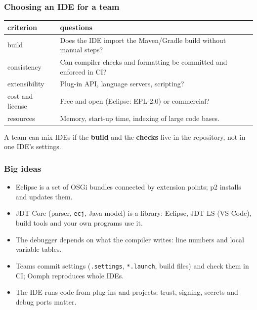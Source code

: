 \documentclass[aspectratio=169,10pt,compress]{beamer}
\begin{document}
\begin{frame}[t,fragile] \frametitle{Choosing an IDE for a team}
  \begin{center}\small
  \begin{tabular}{L{0.26\textwidth}L{0.66\textwidth}}
    \toprule
    \textbf{criterion}            & \textbf{questions} \\
    \midrule
    build                         & Does the IDE import the Maven/Gradle build without manual steps? \\
    consistency                   & Can compiler checks and formatting be committed and enforced in CI? \\
    extensibility                 & Plug-in API, language servers, scripting? \\
    cost and license              & Free and open (Eclipse: EPL-2.0) or commercial? \\
    resources                     & Memory, start-up time, indexing of large code bases. \\
    \bottomrule
  \end{tabular}
  \end{center}
  \small A team can mix IDEs if the \textbf{build} and the \textbf{checks} live in the repository, not in one IDE's settings.
\end{frame}





\begin{frame}[t,fragile] \frametitle{Big ideas}
  \begin{itemize}
    \item Eclipse is a set of OSGi bundles connected by extension points; p2 installs and updates them.
    \item JDT Core (parser, \texttt{ecj}, Java model) is a library: Eclipse, JDT LS (VS Code), build tools and your own programs use it.
    \item The debugger depends on what the compiler writes: line numbers and local variable tables.
    \item Teams commit settings (\texttt{.settings}, \texttt{*.launch}, build files) and check them in CI; Oomph reproduces whole IDEs.
    \item The IDE runs code from plug-ins and projects: trust, signing, secrets and debug ports matter.
  \end{itemize}
\end{frame}
\end{document}
